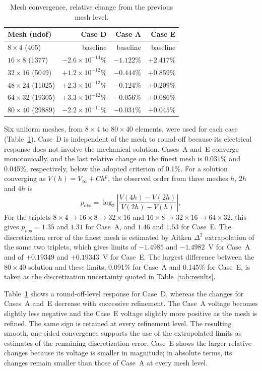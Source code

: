 \documentclass[pdflatex,sn-mathphys-num]{sn-jnl}
\begin{document}
\begin{table}[t]
\centering
\caption{Mesh convergence, relative change from the previous mesh level.}
\label{tab:mesh}
\begin{tabular}{@{}lrrr@{}}
\toprule
Mesh (ndof) & Case D & Case A & Case E \\
\midrule
$8\times4$ (405) & baseline & baseline & baseline \\
$16\times8$ (1377) & $-2.6\times10^{-14}\%$ & $-1.122\%$ & $+2.417\%$ \\
$32\times16$ (5049) & $+1.2\times10^{-12}\%$ & $-0.444\%$ & $+0.859\%$ \\
$48\times24$ (11025) & $+2.3\times10^{-12}\%$ & $-0.124\%$ & $+0.209\%$ \\
$64\times32$ (19305) & $+3.3\times10^{-12}\%$ & $-0.056\%$ & $+0.086\%$ \\
$80\times40$ (29889) & $-2.2\times10^{-11}\%$ & $-0.031\%$ & $+0.045\%$ \\
\bottomrule
\end{tabular}
\end{table}

Six uniform meshes, from $8\times4$ to $80\times40$ elements, were used for each case
(Table~\ref{tab:mesh}). Case~D is independent of the mesh to round-off because its
electrical response does not involve the mechanical solution. Cases~A and~E converge
monotonically, and the last relative change on the finest mesh is 0.031\% and 0.045\%,
respectively, below the adopted criterion of 0.1\%. For a solution converging as
$V(h)=V_\infty+Ch^p$, the observed order from three meshes $h$, $2h$ and $4h$ is
\begin{equation}
p_{\mathrm{obs}}
=\log_2\left|\frac{V(4h)-V(2h)}{V(2h)-V(h)}\right|,
\label{eq:pobs}
\end{equation}
For the triplets $8\times4\to16\times8\to32\times16$ and
$16\times8\to32\times16\to64\times32$, this gives $p_{\mathrm{obs}}=1.35$ and
$1.31$ for Case~A, and $1.46$ and $1.53$ for Case~E. The discretization error of the
finest mesh is estimated by Aitken $\Delta^2$ extrapolation of the same two triplets,
which gives limits of $-1.4985$ and $-1.4982$~V for Case~A and of
$+0.19349$ and $+0.19343$~V for Case~E. The largest difference between the
$80\times40$ solution and these limits, 0.091\% for Case~A and 0.145\% for Case~E,
is taken as the discretization uncertainty quoted in Table~\ref{tab:results}.

Table~\ref{tab:mesh} shows a round-off-level response for Case~D, whereas the changes
for Cases~A and~E decrease with successive refinement. The Case~A voltage becomes
slightly less negative and the Case~E voltage slightly more positive as the mesh is
refined. The same sign is retained at every refinement level. The resulting smooth,
one-sided convergence supports the use of the extrapolated limits as estimates of the
remaining discretization error. Case~E shows the larger relative changes because its
voltage is smaller in magnitude; in absolute terms, its changes remain smaller than
those of Case~A at every mesh level.
\end{document}
